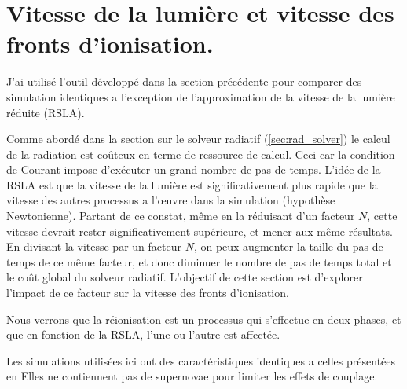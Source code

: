 \chapter{Vitesse de la lumière et vitesse des fronts d'ionisation.}

J'ai utilisé l'outil développé dans la section précédente pour comparer des simulation identiques a l'exception de l'approximation de la vitesse de la lumière réduite (\ac{RSLA}).

Comme abordé dans la section sur le solveur radiatif (\ref{sec:rad_solver}) le calcul de la radiation est coûteux en terme de ressource de calcul.
Ceci car la condition de Courant impose d'exécuter un grand nombre de pas de temps.
L'idée de la \ac{RSLA} est que la vitesse de la lumière est significativement plus rapide que la vitesse des autres processus a l’œuvre dans la simulation (hypothèse Newtonienne).
Partant de ce constat, même en la réduisant d'un facteur $N$, cette vitesse devrait rester significativement supérieure, et mener aux même résultats.
En divisant la vitesse par un facteur $N$, on peux augmenter la taille du pas de temps de ce même facteur, et donc diminuer le nombre de pas de temps total et le coût global du solveur radiatif.
L'objectif de cette section est d'explorer l'impact de ce facteur sur la vitesse des fronts d'ionisation.

Nous verrons que la réionisation est un processus qui s'effectue en deux phases, et que en fonction de la \ac{RSLA}, l'une ou l'autre est affectée.


Les simulations utilisées ici ont des caractéristiques identiques a celles présentées en %
Elles ne contiennent pas de supernovae pour limiter les effets de couplage.



